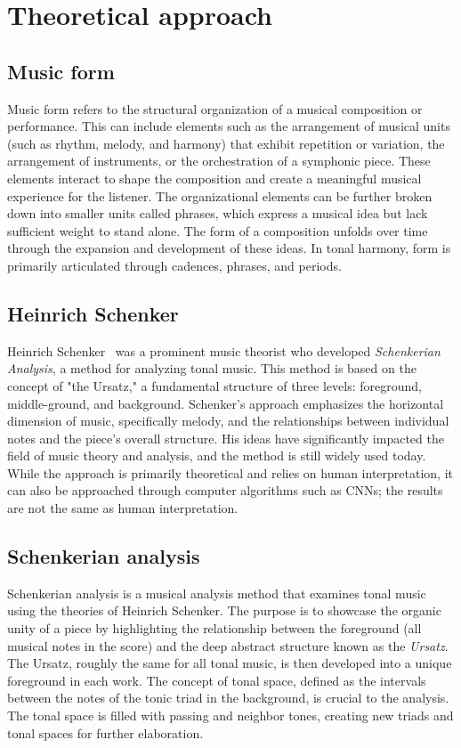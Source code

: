 \section{Theoretical approach}
\subsection{Music form}

Music form refers to the structural organization of a musical composition or performance. This can include elements such as the arrangement of musical units (such as rhythm, melody, and harmony) that exhibit repetition or variation, the arrangement of instruments, or the orchestration of a symphonic piece. These elements interact to shape the composition and create a meaningful musical experience for the listener. The organizational elements can be further broken down into smaller units called phrases, which express a musical idea but lack sufficient weight to stand alone. The form of a composition unfolds over time through the expansion and development of these ideas. In tonal harmony, form is primarily articulated through cadences, phrases, and periods. 

\subsection{Heinrich Schenker}

Heinrich Schenker~\cite{schenkerdocumentsonline} was a prominent music theorist who developed \textit{Schenkerian Analysis}, a method for analyzing tonal music. This method is based on the concept of "the Ursatz," a fundamental structure of three levels: foreground, middle-ground, and background. Schenker's approach emphasizes the horizontal dimension of music, specifically melody, and the relationships between individual notes and the piece's overall structure. His ideas have significantly impacted the field of music theory and analysis, and the method is still widely used today. While the approach is primarily theoretical and relies on human interpretation, it can also be approached through computer algorithms such as CNNs; the results are not the same as human interpretation.

\subsection{Schenkerian analysis}

Schenkerian analysis is a musical analysis method that examines tonal music using the theories of Heinrich Schenker. The purpose is to showcase the organic unity of a piece by highlighting the relationship between the foreground (all musical notes in the score) and the deep abstract structure known as the \textit{Ursatz}. The Ursatz, roughly the same for all tonal music, is then developed into a unique foreground in each work. The concept of tonal space, defined as the intervals between the notes of the tonic triad in the background, is crucial to the analysis. The tonal space is filled with passing and neighbor tones, creating new triads and tonal spaces for further elaboration.

